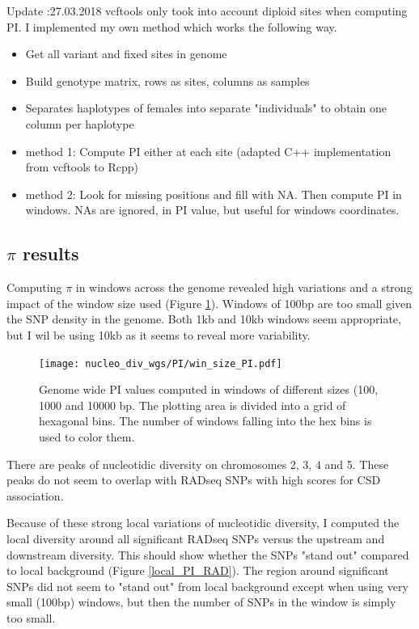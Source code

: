 \documentclass[10pt,a4paper]{report}
\begin{document}
Update :27.03.2018
vcftools only took into account diploid sites when computing PI. I implemented my own method which works the following way.
\begin{itemize}
\item Get all variant and fixed sites in genome
\item Build genotype matrix, rows as sites, columns as samples
\item Separates haplotypes of females into separate "individuals" to obtain one column per haplotype
\item method 1: Compute PI either at each site (adapted C++ implementation from vcftools to Rcpp)
\item method 2: Look for missing positions and fill with NA. Then compute PI in windows. NAs are ignored, in PI value, but useful for windows coordinates.
\end{itemize}
\FloatBarrier
\subsection{$\pi$ results}
Computing $\pi$ in windows across the genome revealed high variations and a strong impact of the window size used (Figure \ref{win_size_pi}). Windows of 100bp are too small given the SNP density in the genome. Both 1kb and 10kb windows seem appropriate, but I wil be using 10kb as it seems to reveal more variability.

\begin{figure}
\texttt{[image: nucleo\_div\_wgs/PI/win\_size\_PI.pdf]}
\caption{Genome wide PI values computed in windows of different sizes (100, 1000 and 10000 bp. The plotting area is divided into a grid of hexagonal bins. The number of windows falling into the hex bins is used to color them.}
\label{win_size_pi}
\end{figure}

There are peaks of nucleotidic diversity on chromosomes 2, 3, 4 and 5.  These peaks do not seem to overlap with RADseq SNPs with high scores for CSD association.

Because of these strong local variations of nucleotidic diversity, I computed the local diversity around all significant RADseq SNPs versus the upstream and downstream diversity. This should show whether the SNPs "stand out" compared to local background (Figure \ref{local_PI_RAD}). The region around significant SNPs did not seem to "stand out" from local background except when using very small (100bp) windows, but then the number of SNPs in the window is simply too small.
\end{document}
